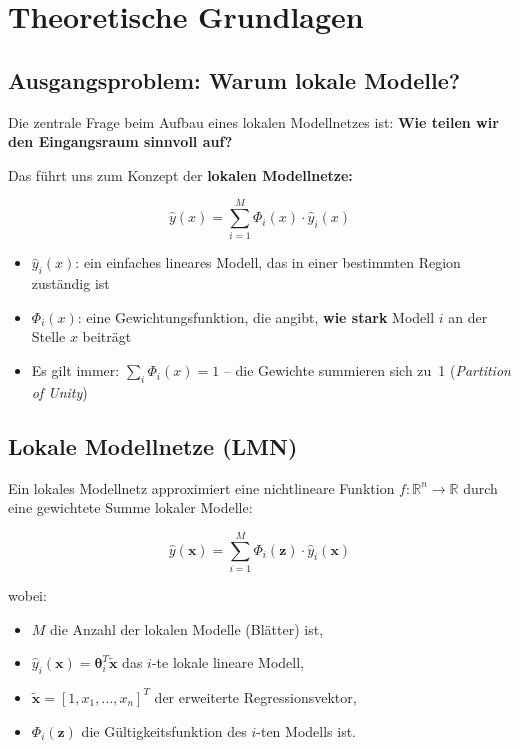 \documentclass[11pt,a4paper]{report}
\begin{document}
	\section{Theoretische Grundlagen}
	
	\subsection{Ausgangsproblem: Warum lokale Modelle?}
	
	Die zentrale Frage beim Aufbau eines lokalen Modellnetzes ist: \textbf{Wie teilen wir den Eingangsraum sinnvoll auf?}
	
	Das führt uns zum Konzept der \textbf{lokalen Modellnetze:}
	
	\begin{equation}
		\hat{y}(x) = \sum_{i=1}^{M} \Phi_i(x) \cdot \hat{y}_i(x)
	\end{equation}
	
	\begin{itemize}
		\item $\hat{y}_i(x)$: ein einfaches lineares Modell, das in einer bestimmten Region \glqq zuständig\grqq{} ist
		\item $\Phi_i(x)$: eine Gewichtungsfunktion, die angibt, \textbf{wie stark} Modell $i$ an der Stelle $x$ beiträgt
		\item Es gilt immer: $\sum_i \Phi_i(x) = 1$ -- die Gewichte summieren sich zu~1 (\textit{Partition of Unity})
	\end{itemize}
	
	\subsection{Lokale Modellnetze (LMN)}
	
	Ein lokales Modellnetz approximiert eine nichtlineare Funktion $f: \mathbb{R}^n \rightarrow \mathbb{R}$ durch eine gewichtete Summe lokaler Modelle:
	
	\begin{equation}
		\hat{y}(\mathbf{x}) = \sum_{i=1}^{M} \Phi_i(\mathbf{z}) \cdot \hat{y}_i(\mathbf{x})
	\end{equation}
	
	wobei:
	\begin{itemize}
		\item $M$ die Anzahl der lokalen Modelle (Blätter) ist,
		\item $\hat{y}_i(\mathbf{x}) = \boldsymbol{\theta}_i^T \tilde{\mathbf{x}}$ das $i$-te lokale lineare Modell,
		\item $\tilde{\mathbf{x}} = [1, x_1, \ldots, x_n]^T$ der erweiterte Regressionsvektor,
		\item $\Phi_i(\mathbf{z})$ die Gültigkeitsfunktion des $i$-ten Modells ist.
	\end{itemize}
	
\end{document}
